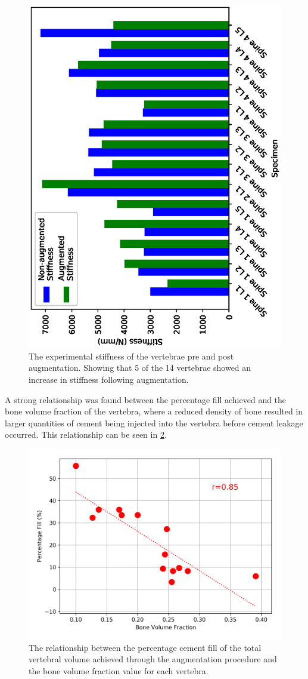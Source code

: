 \begin{figure}[h!]
  \centering
 
\includegraphics[width=.7\textwidth,angle=270]{Chapters/Chapter_HT_images/aug_non_aug_stiffness}
	\caption{The experimental stiffness of the vertebrae pre and post
augmentation. Showing that 5 of the 14 vertebrae showed an increase in
stiffness following augmentation.}
  \label{fig:aug_non_aug_stiffness}
\end{figure}

A strong relationship was found between the percentage fill achieved and the
bone volume fraction of the vertebra, where a reduced density of bone resulted
in larger quantities of cement being injected into the vertebra before cement
leakage occurred.
This relationship can be seen in \cref{fig:cmt_fill_vs_bvtv}.

\begin{figure}[ht!]
  \centering
 
\includegraphics[width=.7\textwidth]{Chapters/Chapter_HT_images/cmt_fill_vs_bvtv.png}
	\caption{The relationship between the percentage cement fill of the total
vertebral volume  achieved through the augmentation procedure and the bone
volume fraction value for each vertebra. }
  \label{fig:cmt_fill_vs_bvtv}
\end{figure}


